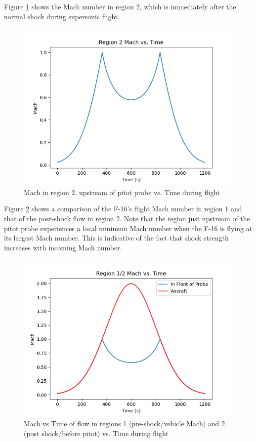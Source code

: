 \documentclass[../main.tex]{subfiles}
\begin{document}
Figure \ref{MvsT_probe} shows the Mach number in region 2, which is immediately after the normal shock during supersonic flight.

\begin{figure}[h]
    \centering
    \includegraphics[scale=.7]{../images/problem_2/Mach_vs_Time_F16_Probe.png}
    \caption{Mach in region 2, upstream of pitot probe vs. Time during flight}
    \label{MvsT_probe}
\end{figure}

Figure \ref{MvsT_probe_aircraft} shows a comparison of the F-16's flight Mach number in region 1 and that of the post-shock flow in region 2.
Note that the region just upstream of the pitot probe experiences a local minimum Mach number when the F-16 is flying at its largest Mach number.
This is indicative of the fact that shock strength increases with incoming Mach number.

\begin{figure}[h]
    \centering
    \includegraphics[scale=.7]{../images/problem_2/Mach_vs_Time_F16_Probe_Aircraft.png}
    \caption{Mach vs Time of flow in regions 1 (pre-shock/vehicle Mach) and 2 (post shock/before pitot) vs. Time during flight}
    \label{MvsT_probe_aircraft}
\end{figure}
\end{document}
